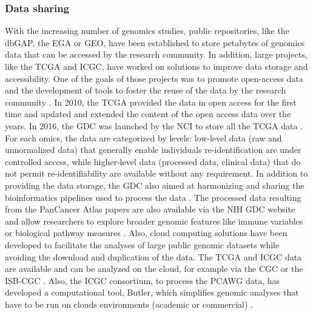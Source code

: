 \subsubsection*{Data sharing}
With the increasing number of genomics studies, public repositories, like the \gls{dbGAP}, the \gls{EGA} or \gls{GEO}, have been established to store petabytes of genomics data that can be accessed by the research community. In addition, large projects, like the \gls{TCGA} and \gls{ICGC}, have worked on solutions to improve data storage and accessibility.  %
One of the goals of those projects was to promote open-access data and the development of tools to foster the reuse of the data by the research community \cite{Weinstein2013,Hudson2010}. In 2010, the \gls{TCGA} provided the data in open access for the first time \cite{TCGA_milestones} and updated and extended the content of the open access data over the years. In 2016, the \gls{GDC} was launched by the \gls{NCI} to store all the \gls{TCGA} data \cite{Jensen2017}. For each omics, the data are categorized by levels: low-level data (raw and unnormalized data) that generally enable individuals re-identification are under controlled access, while higher-level data (processed data, clinical data) that do not permit re-identifiability are available without any requirement. In addition to providing the data storage, the \gls{GDC} also aimed at harmonizing and sharing the bioinformatics pipelines used to process the data \cite{Jensen2017,Gao2019}. The processed data resulting from the PanCancer Atlas papers are also available via the \gls{NIH} \gls{GDC} website \cite{PanCancerAtlas_data} and allow researchers to explore broader genomic features like immune variables \cite{Thorsson2018} or biological pathway measures \cite{Knijnenburg2018}.
Also, cloud computing solutions have been developed to facilitate the analyses of large public genomic datasets while avoiding the download and duplication of the data. The \gls{TCGA} and \gls{ICGC} data are available and can be analyzed on the cloud, for example via the \gls{CGC} \cite{Lau2017} or the \gls{ISB-CGC} \cite{Reynolds2017}. Also, the \gls{ICGC} consortium, to process the \gls{PCAWG} data, has developed a computational tool, Butler, which simplifies genomic analyses that have to be run on clouds environments (academic or commercial) \cite{Yakneen2020}.  \newline

